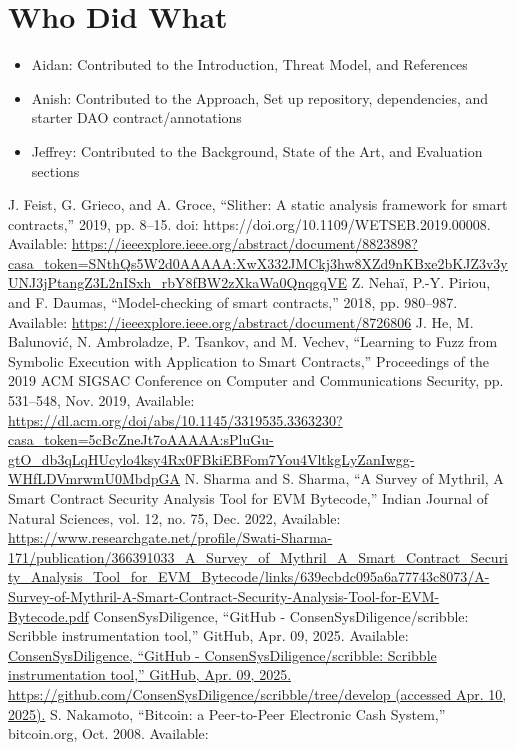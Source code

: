\documentclass[conference]{IEEEtran}
\begin{document}
\section{Who Did What}
\begin{itemize}
    \item Aidan: Contributed to the Introduction, Threat Model, and References
    \item Anish: Contributed to the Approach, Set up repository, dependencies, and starter DAO contract/annotations
    \item Jeffrey: Contributed to the Background, State of the Art, and Evaluation sections
\end{itemize}

\begin{thebibliography}{00}
 J. Feist, G. Grieco, and A. Groce, “Slither: A static analysis framework for smart contracts,” 2019, pp. 8–15. doi: https://doi.org/10.1109/WETSEB.2019.00008. Available: \url{https://ieeexplore.ieee.org/abstract/document/8823898?casa_token=SNthQs5W2d0AAAAA:XwX332JMCkj3hw8XZd9nKBxe2bKJZ3v3yUNJ3jPtangZ3L2nISxh_rbY8fBW2zXkaWa0QnqgqVE}
 Z. Nehaï, P.-Y. Piriou, and F. Daumas, “Model-checking of smart contracts,” 2018, pp. 980–987. Available: \url{https://ieeexplore.ieee.org/abstract/document/8726806}
 J. He, M. Balunović, N. Ambroladze, P. Tsankov, and M. Vechev, “Learning to Fuzz from Symbolic Execution with Application to Smart Contracts,” Proceedings of the 2019 ACM SIGSAC Conference on Computer and Communications Security, pp. 531–548, Nov. 2019, Available: \url{https://dl.acm.org/doi/abs/10.1145/3319535.3363230?casa_token=5cBcZneJt7oAAAAA:sPluGu-gtO_db3qLqHUcylo4ksy4Rx0FBkiEBFom7You4VltkgLyZanIwgg-WHfLDVmrwmU0MbdpGA}
 N. Sharma and S. Sharma, “A Survey of Mythril, A Smart Contract Security Analysis Tool for EVM Bytecode,” Indian Journal of Natural Sciences, vol. 12, no. 75, Dec. 2022, Available:
\url{https://www.researchgate.net/profile/Swati-Sharma-171/publication/366391033_A_Survey_of_Mythril_A_Smart_Contract_Security_Analysis_Tool_for_EVM_Bytecode/links/639ecbdc095a6a77743c8073/A-Survey-of-Mythril-A-Smart-Contract-Security-Analysis-Tool-for-EVM-Bytecode.pdf}
 ConsenSysDiligence, “GitHub - ConsenSysDiligence/scribble: Scribble instrumentation tool,” GitHub, Apr. 09, 2025. Available:  
\url{ConsenSysDiligence, “GitHub - ConsenSysDiligence/scribble: Scribble instrumentation tool,” GitHub, Apr. 09, 2025. https://github.com/ConsenSysDiligence/scribble/tree/develop (accessed Apr. 10, 2025).}
 S. Nakamoto, “Bitcoin: a Peer-to-Peer Electronic Cash System,” bitcoin.org, Oct. 2008. Available: 

\end{thebibliography}
\end{document}

